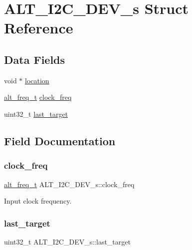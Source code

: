\hypertarget{structALT__I2C__DEV__s}{}\section{A\+L\+T\+\_\+\+I2\+C\+\_\+\+D\+E\+V\+\_\+s Struct Reference}
\label{structALT__I2C__DEV__s}
\subsection*{Data Fields}
\begin{DoxyCompactItemize}
\item 
void $\ast$ \mbox{\hyperlink{structALT__I2C__DEV__s_a794e8b87a3cf07b79de962de213011da}{location}}
\item 
\mbox{\hyperlink{group__CLK__MGR_gaa32fe6dfaa6def16098e0039eb336383}{alt\+\_\+freq\+\_\+t}} \mbox{\hyperlink{structALT__I2C__DEV__s_afa72d864d3a5a27b5cd116e429cb0aeb}{clock\+\_\+freq}}
\item 
uint32\+\_\+t \mbox{\hyperlink{structALT__I2C__DEV__s_a441be50eaacd64244b9266a811097ace}{last\+\_\+target}}
\end{DoxyCompactItemize}


\subsection{Field Documentation}
\mbox{\label{structALT__I2C__DEV__s_afa72d864d3a5a27b5cd116e429cb0aeb}} 
\subsubsection{\texorpdfstring{clock\_freq}{clock\_freq}}
{\footnotesize\ttfamily \mbox{\hyperlink{group__CLK__MGR_gaa32fe6dfaa6def16098e0039eb336383}{alt\+\_\+freq\+\_\+t}} A\+L\+T\+\_\+\+I2\+C\+\_\+\+D\+E\+V\+\_\+s\+::clock\+\_\+freq}

Input clock frequency. \mbox{\label{structALT__I2C__DEV__s_a441be50eaacd64244b9266a811097ace}} 
\subsubsection{\texorpdfstring{last\_target}{last\_target}}
{\footnotesize\ttfamily uint32\+\_\+t A\+L\+T\+\_\+\+I2\+C\+\_\+\+D\+E\+V\+\_\+s\+::last\+\_\+target}

